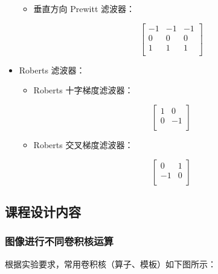 \documentclass[a4paper,12pt]{article}
\begin{document}
\begin{itemize}
\begin{itemize}
            \item 垂直方向 Prewitt 滤波器：
            
            \[
            \begin{bmatrix}
            -1 & -1 & -1 \\
            0 & 0 & 0 \\
            1 & 1 & 1 \\
            \end{bmatrix}
            \]
        \end{itemize}
        
        \item Roberts 滤波器：
        \begin{itemize}
            \item Roberts 十字梯度滤波器：
            
            \[
            \begin{bmatrix}
            1 & 0 \\
            0 & -1 \\
            \end{bmatrix}
            \]
            
            \item Roberts 交叉梯度滤波器：
            
            \[
            \begin{bmatrix}
            0 & 1 \\
            -1 & 0 \\
            \end{bmatrix}
            \]
        \end{itemize}
    \end{itemize}


\subsection{课程设计内容}
\subsubsection{图像进行不同卷积核运算}
根据实验要求，常用卷积核（算子、模板）如下图所示：
\end{document}
